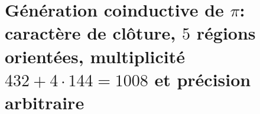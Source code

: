\HMTFlushCurrentChapter
\chapter{Génération coinductive de \texorpdfstring{\(\pi\)}{pi}: caractère de clôture, \(5\) régions orientées, multiplicité \texorpdfstring{\(432+4\cdot144=1008\)}{432+4x144=1008} et précision arbitraire}%
\begingroup
\renewcommand{\chapter}[2][]{}%
%
\endgroup

\HMTFlushCurrentChapter
\chapter{Génération coinductive de \texorpdfstring{\(e\)}{e}: caractère exponentiel, semi-groupe factoriel et retour de phase à mémoire d'état}%
\begingroup
\renewcommand{\chapter}[2][]{}%
%
\endgroup

\HMTFlushCurrentChapter
\chapter{Génération coinductive de \texorpdfstring{\(\varphi\)}{phi}: incidence modale, rayon positif de Perron et unicité de l'auto-échelle}%
\begingroup
\renewcommand{\chapter}[2][]{}%
%
\endgroup

